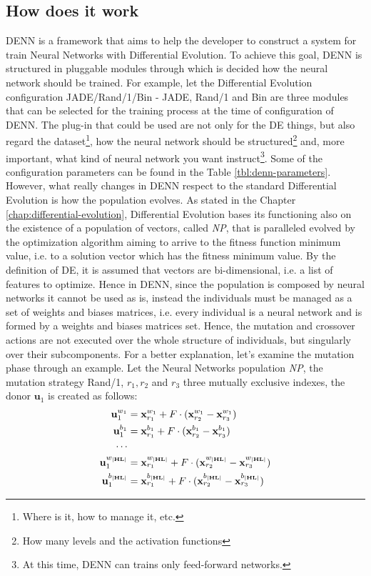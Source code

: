 \subsection{How does it work}
DENN is a framework that aims to help the developer to construct a system for train Neural Networks with Differential Evolution. To achieve this goal, DENN is structured in pluggable modules through which is decided how the neural network should be trained. For example, let the Differential Evolution configuration JADE/Rand/1/Bin - JADE, Rand/1 and Bin are three modules that can be selected for the training process at the time of configuration of DENN. The plug-in that could be used are not only for the DE things, but also regard the dataset\footnote{Where is it, how to manage it, etc.}, how the neural network should be structured\footnote{How many levels and the activation functions} and, more important, what kind of neural network you want instruct\footnote{At this time, DENN can trains only feed-forward networks.}. Some of the configuration parameters can be found in the Table \ref{tbl:denn-parameters}.\newline\newline
However, what really changes in DENN respect to the standard Differential Evolution is how the population evolves. As stated in the Chapter \ref{chap:differential-evolution}, Differential Evolution bases its functioning also on the existence of a population of vectors, called \textit{NP}, that is paralleled evolved by the optimization algorithm aiming to arrive to the fitness function minimum value, i.e. to a solution vector which has the fitness minimum value. By the definition of DE, it is assumed that vectors are bi-dimensional, i.e. a list of features to optimize. Hence in DENN, since the population is composed by neural networks it cannot be used as is, instead the individuals must be managed as a set of weights and biases matrices, i.e. every individual is a neural network and is formed by a weights and biases matrices set. Hence, the mutation and crossover actions are not executed over the whole structure of individuals, but singularly over their subcomponents.\newline\newline
For a better explanation, let's examine the mutation phase through an example. Let the Neural Networks population \textit{NP}, the mutation strategy Rand/1, $r_1, r_2$ and $r_3$ three mutually exclusive indexes, the donor $\textbf{u}_{1}$ is created as follows:
\begin{align}
	\textbf{u}_{1}^{w_1} &= \textbf{x}_{r_1}^{w_1} + F \cdot (\textbf{x}_{r_2}^{w_1} - \textbf{x}_{r_3}^{w_1}) \\
	\textbf{u}_{1}^{b_1} &= \textbf{x}_{r_1}^{b_1} + F \cdot (\textbf{x}_{r_2}^{b_1} - \textbf{x}_{r_3}^{b_1}) \\
	\cdots \cr
	\textbf{u}_{1}^{w_{|\textbf{HL}|}} &= \textbf{x}_{r_1}^{w_{|\textbf{HL}|}} + F \cdot (\textbf{x}_{r_2}^{w_{|\textbf{HL}|}} - \textbf{x}_{r_3}^{w_{|\textbf{HL}|}}) \\
	\textbf{u}_{1}^{b_{|\textbf{HL}|}} &= \textbf{x}_{r_1}^{b_{|\textbf{HL}|}} + F \cdot (\textbf{x}_{r_2}^{b_{|\textbf{HL}|}} - \textbf{x}_{r_3}^{b_{|\textbf{HL}|}})
\end{align}

